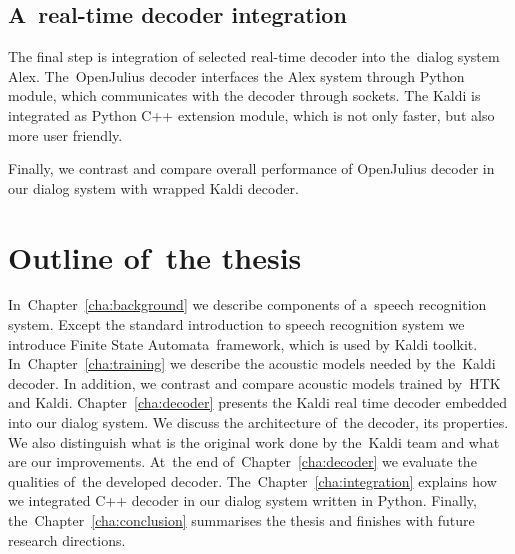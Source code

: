 \subsection{A~real-time decoder integration} 
\label{sub:integration}
The final step is integration of selected real-time decoder into the~dialog system Alex.
The~OpenJulius decoder interfaces the Alex system through Python module, 
which communicates with the decoder through sockets.
The Kaldi is integrated as Python C++ extension module, which is not only faster, 
but also more user friendly.

Finally, we contrast and compare overall performance of OpenJulius decoder 
in our dialog system with wrapped Kaldi decoder.



\section{Outline of~the thesis} 
\label{sec:outline_of_the_thesis}
In~Chapter~\ref{cha:background} we describe components of a~speech recognition system.  
Except the standard introduction to speech recognition system we introduce Finite State Automata~framework,
which is used by Kaldi toolkit. In~Chapter~\ref{cha:training} we describe the acoustic 
models needed by the~Kaldi decoder. 
In addition, we contrast and compare acoustic models trained by~\ac{HTK} and Kaldi. 
Chapter~\ref{cha:decoder} presents the Kaldi real time decoder embedded into our dialog system.
We discuss the architecture of~the decoder, its properties. We also distinguish what is the original work done by 
the~Kaldi team and what are our improvements. At~the end of~Chapter~\ref{cha:decoder} 
we evaluate the qualities of~the developed decoder.
The~Chapter~\ref{cha:integration} explains how we integrated C++ decoder in our dialog system written in Python.
Finally, the~Chapter~\ref{cha:conclusion} summarises the thesis and finishes with future research directions.

